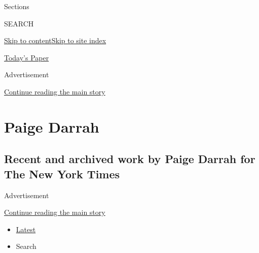 Sections

SEARCH

\protect\hyperlink{site-content}{Skip to
content}\protect\hyperlink{site-index}{Skip to site index}

\href{https://myaccount.nytimes3xbfgragh.onion/auth/login?response_type=cookie\&client_id=vi}{}

\href{https://www.nytimes3xbfgragh.onion/section/todayspaper}{Today's
Paper}

Advertisement

\protect\hyperlink{after-top}{Continue reading the main story}

\hypertarget{paige-darrah}{%
\section{Paige Darrah}\label{paige-darrah}}

\hypertarget{recent-and-archived-work-by-paige-darrah-for-the-new-york-times}{%
\subsection{Recent and archived work by Paige Darrah for The New York
Times}\label{recent-and-archived-work-by-paige-darrah-for-the-new-york-times}}

Advertisement

\protect\hyperlink{after-mid1}{Continue reading the main story}

\begin{itemize}
\tightlist
\item
  \protect\hyperlink{stream-panel}{Latest}
\item
  Search
\end{itemize}

